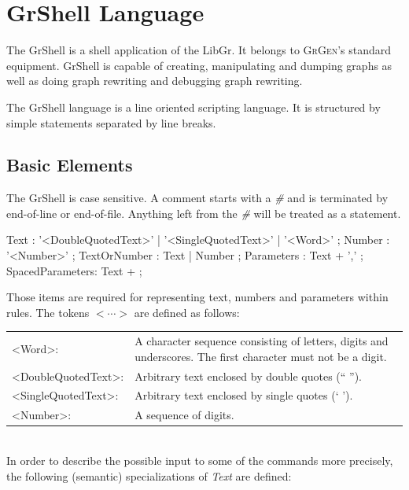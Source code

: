 \documentclass[a4paper,11pt]{report}
\providecommand{\GrG}{{\scshape GrGen}}
\begin{document}
\chapter{GrShell Language}

The GrShell is a shell application of the LibGr. It belongs to \GrG's standard equipment. GrShell is capable of creating, manipulating and dumping graphs as well as doing graph rewriting and debugging graph rewriting.

The GrShell language is a line oriented scripting language. It is structured by simple statements separated by line breaks.

\section{Basic Elements}

The GrShell is case sensitive. A comment starts with a \emph{\#} and is terminated by end-of-line or end-of-file. Anything left from the \emph{\#} will be treated as a statement.

\begin{rail} 
 Text : '<DoubleQuotedText>' | '<SingleQuotedText>' | '<Word>' ;
 Number : '<Number>' ;
 TextOrNumber : Text | Number ;
 Parameters : Text + ',' ;
 SpacedParameters: Text + ; 
\end{rail}

Those items are required for representing text, numbers and parameters within rules. The tokens $<\cdots>$ are defined as follows:\\

\begin{tabularx}{\linewidth}{lX}
<Word>: & A  character sequence consisting of letters, digits and underscores. The first character must not be a digit.\\
<DoubleQuotedText>: & Arbitrary text enclosed by double quotes (`` '').\\
<SingleQuotedText>: & Arbitrary text enclosed by single quotes (` ').\\
<Number>: & A sequence of digits.
\end{tabularx}\\

In order to describe the possible input to some of the commands more precisely, the following (semantic) specializations of \emph{Text} are defined:\\
\end{document}
